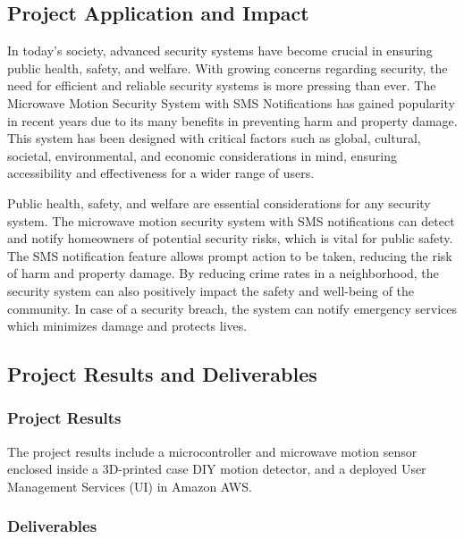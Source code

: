 \subsection{Project Application and Impact}\label{subsec:project-application-and-impact}

In today's society, advanced security systems have become crucial in ensuring public
health, safety, and welfare. %
With growing concerns regarding security, the need for efficient and
reliable security systems is more pressing than ever. %
The Microwave Motion Security System with SMS Notifications has gained popularity in recent years
due to its many benefits in preventing harm and property damage. %
This system has been designed with critical factors such as global, cultural, societal, environmental,
and economic considerations in mind, ensuring accessibility and effectiveness for a
wider range of users. %

Public health, safety, and welfare are essential considerations for any security system. %
The microwave motion security system with SMS notifications can detect and notify
homeowners of potential security risks, which is vital for public safety. %
The SMS notification feature allows prompt action to be taken, reducing the risk of harm
and property damage. %
By reducing crime rates in a neighborhood, the security system
can also positively impact the safety and well-being of the community. %
In case of a security breach, the system can notify emergency services which minimizes damage and
protects lives. %

\subsection{Project Results and Deliverables}\label{subsec:project-results-and-deliverables}

\subsubsection{Project Results}

The project results include a microcontroller and microwave motion sensor
enclosed inside a 3D-printed case DIY motion detector, and a deployed User Management Services (UI) in Amazon AWS\@. %

\subsubsection{Deliverables}

